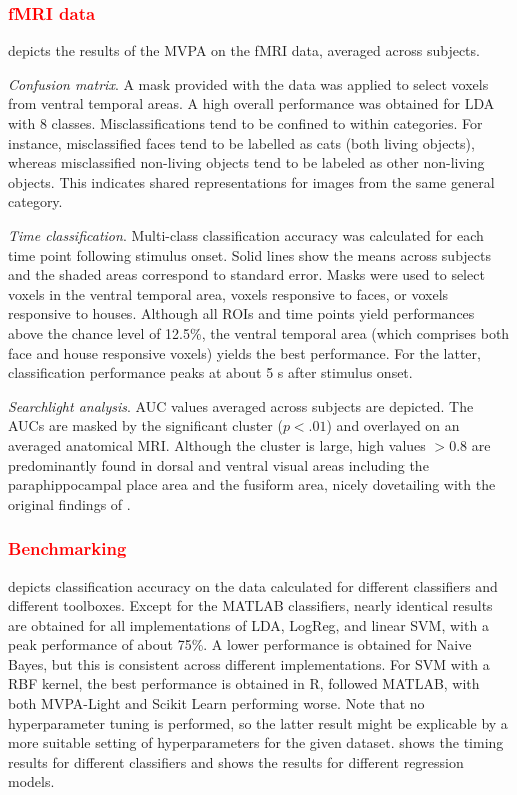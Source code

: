\documentclass[utf8]{frontiersSCNS} %
\newcommand{\red}[1]{\textcolor{red}{#1}}
\begin{document}
\red{\subsubsection{fMRI data}}

 depicts the results of the MVPA on the fMRI data, averaged across subjects.

\textit{Confusion matrix}. A mask provided with the data was applied to select voxels from ventral temporal areas. 
A high overall performance was obtained for LDA with 8 classes. Misclassifications tend to be confined to within categories. For instance, misclassified faces tend to be labelled as cats (both living objects), whereas misclassified non-living objects tend to be labeled as other non-living objects. This indicates shared representations for images from the same general category.

\textit{Time classification}. Multi-class classification accuracy was calculated for each time point following stimulus onset. Solid lines show the means across subjects and the shaded areas correspond to standard error. Masks  were used to select voxels in the ventral temporal area, voxels responsive to faces, or voxels responsive to houses. Although all ROIs and time points yield performances above the chance level of 12.5\%, the ventral temporal area (which comprises both face and house responsive voxels) yields the best performance. For the latter, classification performance peaks at about 5 s after stimulus onset.

\textit{Searchlight analysis}. AUC values averaged across subjects are depicted. The AUCs are masked by the significant cluster ($p < .01$) and overlayed on an averaged anatomical MRI. Although the cluster is large, high values $>0.8$ are predominantly found in dorsal and ventral visual areas including the paraphippocampal place area and the fusiform area, nicely dovetailing with the original findings of \cite{Haxby2001}.

\red{\subsubsection{Benchmarking}}

 depicts classification accuracy on the \cite{Wakeman2015ADataset} data calculated for different classifiers and different toolboxes. Except for the MATLAB classifiers, nearly identical results are obtained for all implementations of LDA, LogReg, and linear SVM, with a peak performance of about 75\%. A lower performance is obtained for Naive Bayes, but this is consistent across different implementations. For SVM with a RBF kernel, the best performance is obtained in R, followed MATLAB, with both MVPA-Light and Scikit Learn performing worse. Note that no hyperparameter tuning is performed, so the latter result might be explicable by a more suitable setting of hyperparameters for the given dataset.  shows the timing results for different classifiers and  shows the results for different regression models. 
\end{document}
